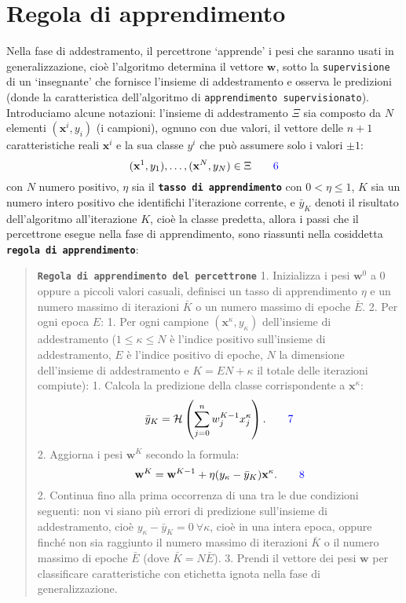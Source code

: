 \documentclass[
  letterpaper,
  DIV=11,
  numbers=noendperiod]{scrreprt}
\begin{document}
\section{Regola di apprendimento}\label{regola-di-apprendimento}

Nella fase di addestramento, il percettrone `apprende' i pesi che
saranno usati in generalizzazione, cioè l'algoritmo determina il vettore
\(\mathbf{w}\), sotto la \texttt{supervisione} di un `insegnante' che
fornisce l'insieme di addestramento e osserva le predizioni (donde la
caratteristica dell'algoritmo di
\texttt{apprendimento\ supervisionato}).\\
Introduciamo alcune notazioni: l'insieme di addestramento \(\Xi\) sia
composto da \(N\) elementi \((\mathbf{x}^i, y_i)\) (i campioni), ognuno
con due valori, il vettore delle \(n+1\) caratteristiche reali
\(\mathbf{x}^i\) e la sua classe \(y^i\) che può assumere solo i valori
\(\pm1\): \[
(\mathbf{x}^1, y_1), \dots, (\mathbf{x}^N, y_N)\in\Xi\tag*{\color{blue}{6}}
\] con \(N\) numero positivo, \(\eta\) sia il
\textbf{\texttt{tasso\ di\ apprendimento}} con \(0<\eta≤1\), \(K\) sia
un numero intero positivo che identifichi l'iterazione corrente, e
\(\bar{y}_K\) denoti il risultato dell'algoritmo all'iterazione \(K\),
cioè la classe predetta, allora i passi che il percettrone esegue nella
fase di apprendimento, sono riassunti nella cosiddetta
\textbf{\texttt{regola\ di\ apprendimento}}:

\begin{quote}
\textbf{\texttt{Regola\ di\ apprendimento\ del\ percettrone}} 1.
Inizializza i pesi \(\mathbf{w}^0\) a \(0\) oppure a piccoli valori
casuali, definisci un tasso di apprendimento \(\eta\) e un numero
massimo di iterazioni \(\bar{K}\) o un numero massimo di epoche
\(\bar{E}\). 2. Per ogni epoca \(E\): 1. Per ogni campione
\((\mathbf{x}^\kappa, y_\kappa)\) dell'insieme di addestramento
(\(1≤\kappa≤N\) è l'indice positivo sull'insieme di addestramento, \(E\)
è l'indice positivo di epoche, \(N\) la dimensione dell'insieme di
addestramento e \(K=EN+\kappa\) il totale delle iterazioni compiute): 1.
Calcola la predizione della classe corrispondente a
\(\mathbf{x}^\kappa\): \[
     \bar{y}_K=\mathcal{H}\left(\sum_{j=0}^{n} w_j^{K-1} x_j^\kappa\right).\tag*{\color{blue}{7}}
     \] 2. Aggiorna i pesi \(\mathbf{w}^K\) secondo la formula: \[
      \mathbf{w}^K=\mathbf{w}^{K-1}+\eta(y_\kappa-\bar{y}_K)\mathbf{x}^\kappa.\tag* {\color{blue}{8}}
      \] 2. Continua fino alla prima occorrenza di una tra le due
condizioni seguenti: non vi siano più errori di predizione sull'insieme
di addestramento, cioè \(y_\kappa-\bar{y}_K=0\ \forall \kappa\), cioè in
una intera epoca, oppure finché non sia raggiunto il numero massimo di
iterazioni \(\bar{K}\) o il numero massimo di epoche \(\bar{E}\) (dove
\(\bar{K}=N\bar{E}\)). 3. Prendi il vettore dei pesi \(\mathbf{w}\) per
classificare caratteristiche con etichetta ignota nella fase di
generalizzazione.
\end{quote}
\end{document}
